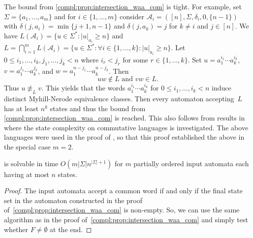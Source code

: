 \begin{remark}
	The bound from \cref{compl:prop:intersection_waa_com} is tight.
	For example, set $\Sigma = \{a_1, \ldots, a_m\}$
	and for $i \in \{1,\ldots,m\}$ consider $\mathcal A_i = ([n], \Sigma, \delta_i, 0, \{n-1\})$
	with $\delta(j, a_i) = \min\{j+1,n-1\}$ and $\delta(j, a_k) = j$
	for $k \ne i$ and $j \in [n]$. We have $L(\mathcal A_i) = \{ u \in \Sigma^* : |u|_{a_i} \ge n\}$
	and $L = \bigcap_{i=1}^m L(\mathcal A_i) =  \{ u \in \Sigma^* : \forall i \in \{1,\ldots,k\} \colon |u|_{a_i} \ge n \}$.
	Let $0 \le i_1, \ldots, i_k, j_1, \ldots, j_k < n$
	where $i_r < j_r$ for some $r \in \{1,\ldots,k\}$.
	Set $u = a_1^{i_1} \cdots a_k^{i_k}$,
	$v = a_1^{j_1} \cdots a_k^{j_k}$,	
	and $w = a_1^{n - j_1} \cdots a_k^{n - j_k}$.
	Then
	\[
	uw \notin L \text{ and }
	vw \in L.
	\]
	Thus $u \not\equiv_L v$.
	This yields that the words $a_1^{i_1} \cdots a_k^{i_k}$
	for $0 \le i_1, \ldots, i_k < n$
	induce distinct Myhill-Nerode equivalence classes.
	Then every automaton accepting~$L$ has at least $n^k$ states
	and thus the bound from \cref{compl:prop:intersection_waa_com}
	is reached.	
	This also follows from results in~\cite{DBLP:journals/iandc/Hoffmann24}
	where the state complexity on commutative languages is investigated.
	The above languages were used in the proof of \cite[Thm.~1]{DBLP:journals/ijfcs/BrzozowskiL12},
	so that this proof established the above in the special case $m = 2$.
\end{remark}

\begin{corollary}	\label{compl:cor:intersection_waa_com}
	\DFAINT is solvable in time $O(m|\Sigma|n^{|\Sigma|+1})$
	for $m$ partially ordered input automata each having at most $n$ states.	
\end{corollary}
\begin{proof}
	The input automata accept a common word if and only if 
	the final state set in the automaton constructed
	in the proof of~\cref{compl:prop:intersection_waa_com}
	is non-empty.
	So, we can use the same algorithm
	as in the proof of~\cref{compl:prop:intersection_waa_com}
	and simply test whether $F \ne \emptyset$
	at the end.
\end{proof}

